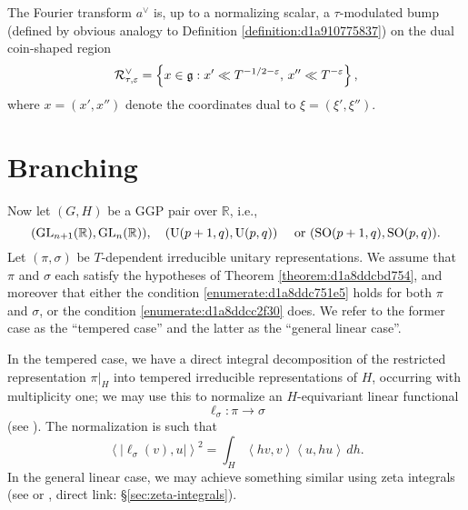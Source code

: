 \documentclass[reqno]{amsart} 
\numberwithin{equation}{section}
\numberwithin{theorem}{section}
\begin{document}
\begin{remark}
  The Fourier transform $a^\vee$ is, up to a normalizing scalar, a $\tau$-modulated bump (defined by obvious analogy to Definition \ref{definition:d1a910775837}) on the dual coin-shaped region
  \begin{equation*}
    \mathcal{R}_{\tau,\varepsilon}^\vee = \left\{ x \in \mathfrak{g} : x ' \ll T^{-1/2-\varepsilon}, \, x '' \ll T^{-\varepsilon} \right\},
  \end{equation*}
  where $x = (x', x'')$ denote the coordinates dual to $\xi = (\xi ', \xi '')$.
\end{remark}

\section{Branching}\label{sec:d1a8de615a31}
Now let $(G,H)$ be a GGP pair over $\mathbb{R}$, i.e.,
\begin{equation*}
  (\operatorname{GL}_{n+1}(\mathbb{R}), \operatorname{GL}_n(\mathbb{R})),
  \quad
  (\operatorname{U}(p+1,q), \operatorname{U}(p,q))
  \quad
  \text{ or } 
  (\operatorname{SO}(p+1,q), \operatorname{SO}(p,q)).
\end{equation*}
Let $(\pi,\sigma)$ be $T$-dependent irreducible unitary representations.  We assume that $\pi$ and $\sigma$ each satisfy the hypotheses of Theorem \ref{theorem:d1a8ddcbd754}, and moreover that either the condition \eqref{enumerate:d1a8ddc751e5} holds for both $\pi$ and $\sigma$, or the condition \eqref{enumerate:d1a8ddcc2f30} does.  We refer to the former case as the ``tempered case'' and the latter as the ``general linear case''.

In the tempered case, we have a direct integral decomposition of the restricted representation $\pi|_{H}$ into tempered irreducible representations of $H$, occurring with multiplicity one; we may use this to normalize an $H$-equivariant linear functional
\begin{equation*}
  \ell_\sigma : \pi \rightarrow \sigma
\end{equation*}
(see \cite[\S18]{nelson-venkatesh-1}).  The normalization is such that
\begin{equation}\label{eqn:d1a8de462057}
  \left\langle \left\lvert \ell_\sigma(v), u \right\rvert \right\rangle^2
  = \int_{H} \left\langle h v, v \right\rangle \left\langle u , h u  \right\rangle \, d h.
\end{equation}
In the general linear case, we may achieve something similar using zeta integrals (see \cite{MR701565} or \cite[\S2.14.4]{2021arXiv210915230N}, direct link: \S\ref{sec:zeta-integrals}).
\end{document}

